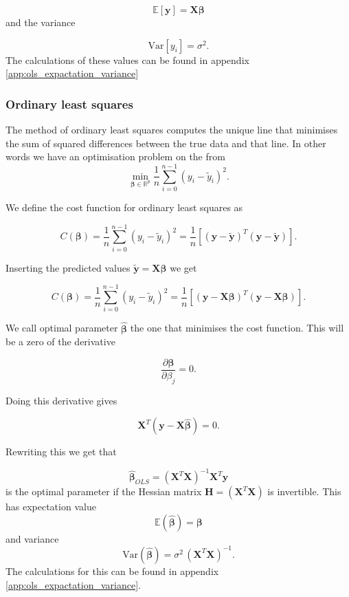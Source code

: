 \begin{equation}\label{eq:expectation_y}
\mathbb{E}[\mathbf y] = \mathbf{X}\boldsymbol{\beta}
\end{equation}
and the variance

\begin{equation}\label{eq:variance_y}
\mbox{Var}[ y_i] = \sigma^2.
\end{equation}
The calculations of these values can be found in appendix \ref{app:ols_expactation_variance}

\subsubsection{Ordinary least squares}
The method of ordinary least squares computes the unique line that minimises the sum of squared differences between the true data and that line. In other words we have an optimisation problem on the from
$$
{\displaystyle \min_{\boldsymbol{\beta}\in
{\mathbb{R}}^{p}}}\frac{1}{n}\sum_{i=0}^{n-1}\left(y_i-\tilde{y}_i\right)^2.
$$

We define the cost function for ordinary least squares as

$$
C(\boldsymbol\beta) = \frac{1}{n}\sum_{i=0}^{n-1}(y_i-\tilde{y}_i)^2=\frac{1}{n}\left[(\mathbf{y}-\mathbf{\tilde y})^T(\mathbf{y}-\mathbf{\tilde y}) \right].
$$


Inserting the predicted values $\mathbf{\tilde y}=\mathbf{X}\boldsymbol\beta$ we get

$$
C(\boldsymbol\beta) = \frac{1}{n}\sum_{i=0}^{n-1}(y_i-\tilde{y}_i)^2=\frac{1}{n}\left[(\mathbf{y}-\mathbf{X}\boldsymbol\beta)^T(\mathbf{y}-\mathbf{X}\boldsymbol\beta) \right].
$$

We call optimal parameter $\hat{\boldsymbol\beta}$ the one that minimises the cost function. This will be a zero of the derivative

$$
\frac{\partial \boldsymbol\beta}{\partial \beta_j} = 0.
$$

Doing this derivative gives

$$
\mathbf{X}^T (\mathbf{y}-\mathbf{X}\hat{\boldsymbol{\beta}} )=0.
$$

Rewriting this we get that

\begin{equation}\label{eq:beta_OLS}
    \hat{\boldsymbol\beta}_{OLS}=(\mathbf{X}^T\mathbf{X})^{-1}\mathbf{X}^T\mathbf{y}
\end{equation}
is the optimal parameter if the Hessian matrix $\mathbf{H}=(\mathbf{X}^T\mathbf{X})$ is invertible. This has expectation value 
\begin{equation}\label{eq:expectation_beta}
\mathbb{E}(\boldsymbol{\hat{\beta}}) =\boldsymbol{\beta}
\end{equation}
and variance
\begin{equation}\label{eq:variance_beta}
\mbox{Var}(\boldsymbol{\hat{\beta}})  = \sigma^2 \, (\mathbf{X}^{T} \mathbf{X})^{-1}.
\end{equation}
The calculations for this can be found in appendix \ref{app:ols_expactation_variance}.


